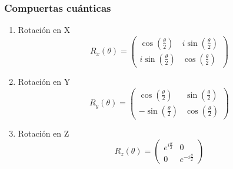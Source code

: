 \documentclass[xetex,mathserif,serif, 8pt]{beamer}
\begin{document}
\begin{frame}
    \frametitle{Compuertas cuánticas}

    \begin{enumerate}
        \item Rotación en X
            \[
            R_x(\theta) =
            \begin{pmatrix}
            \cos(\frac{\theta}{2}) & i \sin(\frac{\theta}{2}) \\
            i\sin(\frac{\theta}{2}) & \cos(\frac{\theta}{2})
            \end{pmatrix}
            \]

        \item Rotación en Y
            \[
            R_y(\theta) =
            \begin{pmatrix}
            \cos(\frac{\theta}{2}) & \sin(\frac{\theta}{2}) \\
            -\sin(\frac{\theta}{2}) & \cos(\frac{\theta}{2})
            \end{pmatrix}
            \]

        \item Rotación en Z
            \[
            R_z(\theta) =
            \begin{pmatrix}
            e^{i \frac{\theta}{2}} & 0 \\
            0 & e^{-i \frac{\theta}{2}}
            \end{pmatrix}
            \]

    \end{enumerate}

\end{frame}
\end{document}
